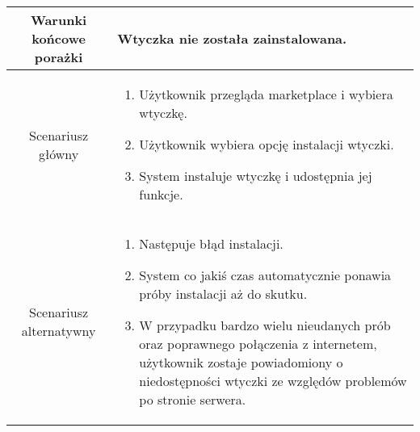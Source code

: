 \documentclass{article}
\begin{document}
\begin{enumerate}
\begin{enumerate}
\begin{table}[H]
\begin{tabular}{|c|p{7cm}|}
						\hline
						Warunki końcowe porażki & Wtyczka nie została zainstalowana.                                                                                                                                                                                                                                                                                                            \\
						\hline
						Scenariusz główny       & \begin{enumerate}\item Użytkownik przegląda marketplace i wybiera wtyczkę.

\item Użytkownik wybiera opcję instalacji wtyczki.

\item System instaluje wtyczkę i udostępnia jej funkcje.\end{enumerate}                                                                                                                                       \\
						\hline
						Scenariusz alternatywny & \begin{enumerate}\item Następuje błąd instalacji.

\item System co jakiś czas automatycznie ponawia próby instalacji aż do skutku.

\item W przypadku bardzo wielu nieudanych prób oraz poprawnego połączenia z internetem, użytkownik zostaje powiadomiony o niedostępności wtyczki ze względów problemów po stronie serwera.\end{enumerate} \\
						\hline
					\end{tabular}
				\end{table}


\end{enumerate}
\end{enumerate}
\end{document}
